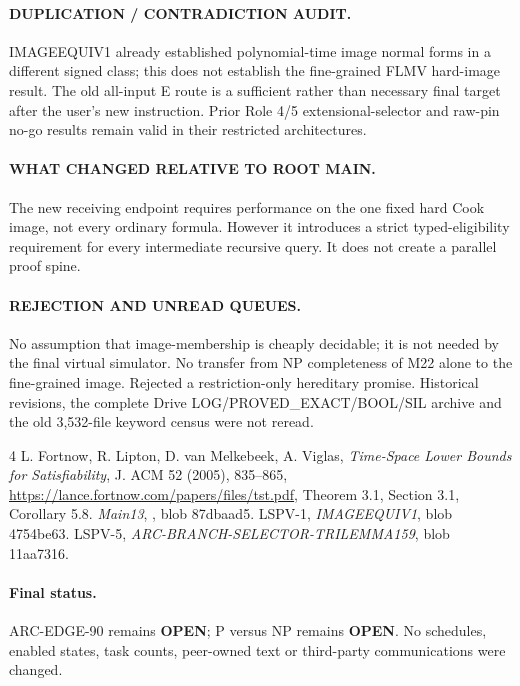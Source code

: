 \documentclass[11pt]{article}
\begin{document}
\paragraph{DUPLICATION / CONTRADICTION AUDIT.}
IMAGEEQUIV1 already established polynomial-time image normal forms
in a different signed class; this does not establish the fine-grained
FLMV hard-image result. The old all-input E route is a sufficient
rather than necessary final target after the user's new instruction.
Prior Role 4/5 extensional-selector and raw-pin no-go results remain
valid in their restricted architectures.

\paragraph{WHAT CHANGED RELATIVE TO ROOT MAIN.}
The new receiving endpoint requires performance on the one fixed
hard Cook image, not every ordinary formula. However it introduces
a strict typed-eligibility requirement for every intermediate
recursive query. It does not create a parallel proof spine.

\paragraph{REJECTION AND UNREAD QUEUES.}
No assumption that image-membership is cheaply decidable; it is not
needed by the final virtual simulator. No transfer from NP
completeness of M22 alone to the fine-grained image. Rejected a
restriction-only hereditary promise. Historical revisions, the
complete Drive LOG/PROVED\_EXACT/BOOL/SIL archive and the old
3,532-file keyword census were not reread.

\begin{thebibliography}{4}
 L. Fortnow, R. Lipton, D. van Melkebeek, A. Viglas,
\emph{Time-Space Lower Bounds for Satisfiability},
J. ACM 52 (2005), 835--865,
\url{https://lance.fortnow.com/papers/files/tst.pdf},
Theorem 3.1, Section 3.1, Corollary 5.8.
 \emph{Main13}, , blob 87dbaad5.
 LSPV-1, \emph{IMAGEEQUIV1}, blob 4754be63.
 LSPV-5, \emph{ARC-BRANCH-SELECTOR-TRILEMMA159},
blob 11aa7316.
\end{thebibliography}
\paragraph{Final status.}
ARC-EDGE-90 remains \textbf{OPEN}; P versus NP remains \textbf{OPEN}.
No schedules, enabled states, task counts, peer-owned text or
third-party communications were changed.
\end{document}
